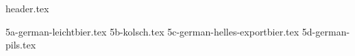 \clearpage
{}
\divisorLine

{header.tex}

\begin{multicols}{2}

{5a-german-leichtbier.tex}
{5b-kolsch.tex}
{5c-german-helles-exportbier.tex}
{5d-german-pils.tex}

\end{multicols}